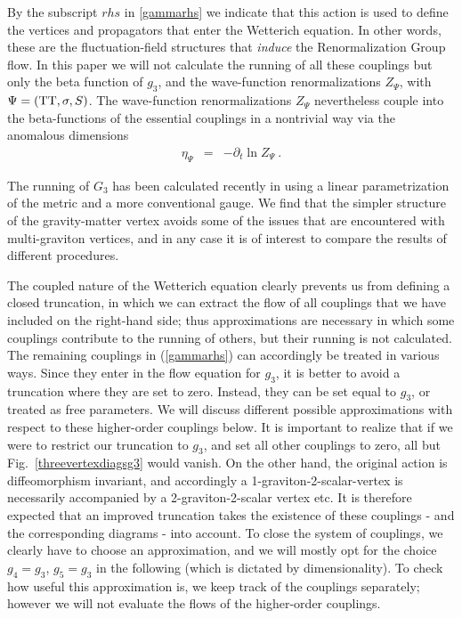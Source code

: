 \documentclass[11pt]{book} %
\newcommand{\bea}{\begin{eqnarray}}
\newcommand{\eea}{\end{eqnarray}}
\begin{document}
By the subscript $rhs$ in \eqref{gammarhs} we indicate that this action is used to define the vertices and propagators that enter the Wetterich equation.  In other words, these are the fluctuation-field structures that \emph{induce} the Renormalization Group flow.
In this paper we will not calculate the running of all these couplings but only the beta function of $g_3$, and the wave-function renormalizations $Z_\Psi$, with $\Psi=({\rm TT},\sigma,S)$.
The wave-function renormalizations $Z_\Psi$ nevertheless couple into the beta-functions of the essential couplings in a nontrivial way via the anomalous dimensions
\bea
\eta_\Psi &=&-\partial_t\ln Z_\Psi\ .
\eea

The running of $G_3$ has been calculated recently in \cite{Meibohm:2015twa} using a linear parametrization of the metric
and a more conventional gauge.
We find that the simpler structure of the gravity-matter vertex
avoids some of the issues that are encountered with multi-graviton vertices, and in any case it is of interest to compare the results of different procedures.

The coupled nature of the Wetterich equation clearly prevents us from defining a closed truncation, in which we can extract the flow of all couplings that we have included on the right-hand side; thus approximations are necessary in which some couplings contribute to the running of others, but their running is not calculated.
The remaining couplings in (\ref{gammarhs})
can accordingly be treated in various ways.
Since they enter in the flow equation for $g_3$,
it is better to avoid a truncation where they are set to zero.
Instead, they can be set equal to $g_3$, or treated as free parameters.
We will discuss different possible approximations with respect to these higher-order couplings below.
It is important to realize that if we were to restrict our truncation to $g_3$, and set all other couplings to zero, all but
Fig.~\ref{threevertexdiagsg3} would vanish. On the other hand, the original action is diffeomorphism invariant, and accordingly a 1-graviton-2-scalar-vertex is necessarily accompanied by a 2-graviton-2-scalar vertex etc. It is therefore expected that an improved truncation takes the existence of these couplings - and the corresponding diagrams - into account. To close the system of couplings, we clearly have to choose an approximation, and we will mostly opt for the choice $g_4=g_3$, $g_5=g_3$ in the following (which is dictated by dimensionality). To check how useful this approximation is, we keep track of the couplings separately; however we will not evaluate the flows of the higher-order couplings.
\end{document}
